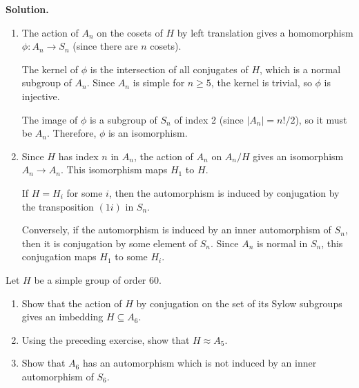 \noindent\textbf{Solution.}
\begin{enumerate}[label=(\alph*)]
\item The action of $A_n$ on the cosets of $H$ by left translation gives a homomorphism $\phi: A_n \to S_n$ (since there are $n$ cosets).

The kernel of $\phi$ is the intersection of all conjugates of $H$, which is a normal subgroup of $A_n$. Since $A_n$ is simple for $n \geq 5$, the kernel is trivial, so $\phi$ is injective.

The image of $\phi$ is a subgroup of $S_n$ of index 2 (since $|A_n| = n!/2$), so it must be $A_n$. Therefore, $\phi$ is an isomorphism.

\item Since $H$ has index $n$ in $A_n$, the action of $A_n$ on $A_n/H$ gives an isomorphism $A_n \to A_n$. This isomorphism maps $H_1$ to $H$.

If $H = H_i$ for some $i$, then the automorphism is induced by conjugation by the transposition $(1i)$ in $S_n$.

Conversely, if the automorphism is induced by an inner automorphism of $S_n$, then it is conjugation by some element of $S_n$. Since $A_n$ is normal in $S_n$, this conjugation maps $H_1$ to some $H_i$.
\end{enumerate}

\begin{problembox}
Let $H$ be a simple group of order 60.
\begin{enumerate}[label=(\alph*)]
\item Show that the action of $H$ by conjugation on the set of its Sylow subgroups gives an imbedding $H \subseteq A_6$.
\item Using the preceding exercise, show that $H \approx A_5$.
\item Show that $A_6$ has an automorphism which is not induced by an inner automorphism of $S_6$.
\end{enumerate}
\end{problembox}

